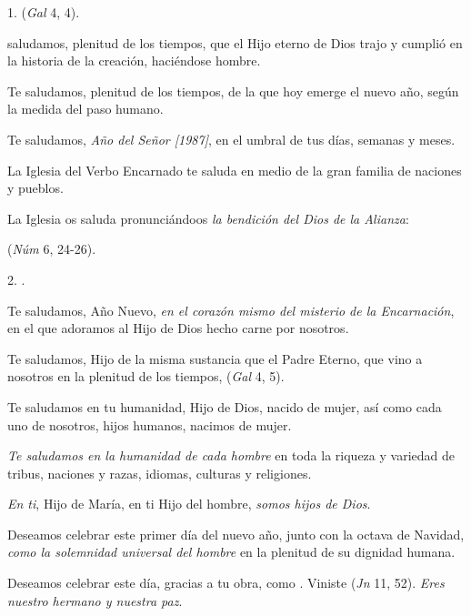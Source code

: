 \begin{body}
	1.  (\emph{Gal} 4, 4).
	
	 saludamos, plenitud de los tiempos, que el Hijo eterno de Dios trajo y cumplió en la historia de la creación, haciéndose hombre.
	
	Te saludamos, plenitud de los tiempos, de la que hoy emerge el nuevo año, según la medida del paso humano.
	
	Te saludamos, \emph{Año del Señor {[}1987{]}}, en el umbral de tus días, semanas y meses.
	
	La Iglesia del Verbo Encarnado te saluda en medio de la gran familia de naciones y pueblos.
	
	La Iglesia os saluda pronunciándoos \emph{la bendición del Dios de la 	Alianza}:
	
	 (\emph{Núm} 6, 24-26).
	
	2. .
	
	Te saludamos, Año Nuevo, \emph{en el corazón mismo del misterio de la 	Encarnación}, en el que adoramos al Hijo de Dios hecho carne por nosotros.
	
	Te saludamos, Hijo de la misma sustancia que el Padre Eterno, que vino a nosotros en la plenitud de los tiempos,  (\emph{Gal} 4, 5).
	
	Te saludamos en tu humanidad, Hijo de Dios, nacido de mujer, así como cada uno de nosotros, hijos humanos, nacimos de mujer.
	
	\emph{Te saludamos en la humanidad de cada hombre} en toda la riqueza y variedad de tribus, naciones y razas, idiomas, culturas y religiones.
	
	\emph{En ti}, Hijo de María, en ti Hijo del hombre, \emph{somos hijos de 	Dios}.
	
	Deseamos celebrar este primer día del nuevo año, junto con la octava de Navidad, \emph{como la solemnidad universal del hombre} en la plenitud de su dignidad humana.
	
	Deseamos celebrar este día, gracias a tu obra, como . Viniste  (\emph{Jn} 11, 52). \emph{Eres nuestro hermano y nuestra paz}.
	

\end{body}
